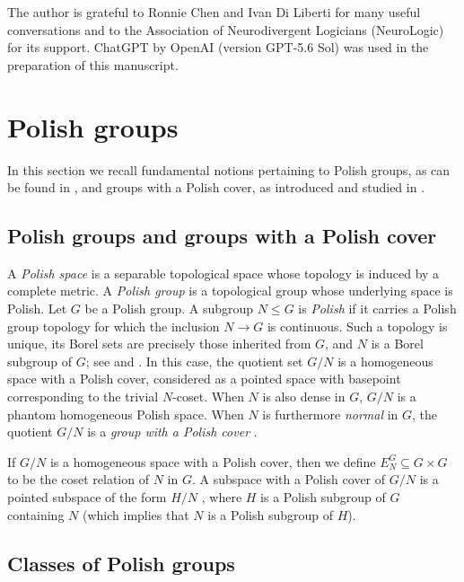 \documentclass[12pt]{amsart}
\theoremstyle{definition}
\begin{document}
The author is grateful to Ronnie Chen and Ivan Di Liberti for many useful conversations and
to the Association of Neurodivergent Logicians (NeuroLogic) for its support.
ChatGPT by OpenAI (version GPT-5.6 Sol) was used in the preparation of this
manuscript.

\section{Polish groups\label{Section:Polish}}

In this section we recall fundamental notions pertaining to Polish groups,
as can be found in \cite{gao_invariant_2009,kechris_classical_1995}, and
groups with a Polish cover, as introduced and studied in \cite%
{lupini_looking_2024,bergfalk_definable_2024,bergfalk_definable_2024-1,casarosa_homological_2026}%
.

\subsection{Polish groups and groups with a Polish cover}

A \emph{Polish space} is a separable topological space whose topology is
induced by a complete metric. A \emph{Polish group} is a topological group
whose underlying space is Polish. Let $G$ be a Polish group. A subgroup $%
N\leq G$ is \emph{Polish} if it carries a Polish group topology for which
the inclusion $N\rightarrow G$ is continuous. Such a topology is unique, its
Borel sets are precisely those inherited from $G$, and $N$ is a Borel
subgroup of $G$; see \cite[Theorem~9.10]{kechris_classical_1995} and \cite[%
Section~2.2]{gao_invariant_2009}. In this case, the quotient set $G/N$ is a
homogeneous space with a Polish cover, considered as a pointed space with
basepoint corresponding to the trivial $N$-coset. When $N$ is also dense in $%
G$, $G/N$ is a phantom homogeneous Polish space. When $N$ is furthermore 
\emph{normal} in $G$, the quotient $G/N$ is a \emph{group with a Polish cover%
}.

If $G/N$ is a homogeneous space with a Polish cover, then we define $%
E_{N}^{G}\subseteq G\times G$ to be the coset relation of $N$ in $G$. A
subspace with a Polish cover of $G/N$ is a pointed subspace of the form $H/N$%
, where $H$ is a Polish subgroup of $G$ containing $N$ (which implies that $%
N $ is a Polish subgroup of $H$).

\subsection{Classes of Polish groups\label{Subsection:classes}}
\end{document}
